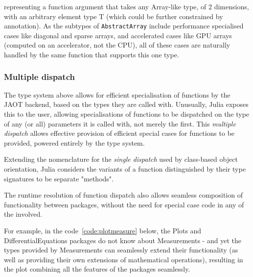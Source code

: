 \documentclass{webofc}
\begin{document}
representing a function argument that takes any Array-like type, of 2 dimensions,
with an arbitrary element type T (which could be further constrained by annotation).
As the subtypes of \verb$AbstractArray$ include performance specialised cases like
diagonal and sparse arrays, and accelerated cases like GPU arrays (computed on
an accelerator, not the CPU), all of these cases are naturally handled by the same
function that supports this one type. 

\subsubsection{Multiple dispatch}

The type system above allows for efficient specialisation of functions by the JAOT
 backend, based on the types they are called with.
Unusually, Julia exposes this to the user, allowing specialisations of functions
to be dispatched on the type of any (or all) parameters it is called with, not
merely the first. This \textit{multiple dispatch} allows effective provision of
efficient special cases for functions to be provided, powered entirely by the type
system.

Extending the nomenclature for the \textit{single dispatch} used by
class-based object orientation, Julia considers the variants of a function
distinguished by their type signatures to be separate "methods". 

The runtime resolution of function dispatch also allows seamless composition
of functionality between packages, without the need for special case
code in any of the involved.

For example, in the code~\ref{code:plotmeasure} below, the Plots and
DifferentialEquations packages do not know about Measurements - and yet
the types provided by Measurements can seamlessly extend their
functionality (as well as providing their own extensions of mathematical
operations), resulting in the plot combining all the features of the
packages seamlessly.
\end{document}
